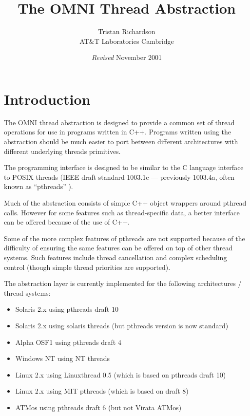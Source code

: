 \documentclass[11pt,twoside,a4paper]{article}
\title{The OMNI Thread Abstraction}
\author{Tristan Richardson\\
AT\&T Laboratories Cambridge \\
}
\date{\textit{Revised} November 2001}
\begin{document}
\maketitle

\section{Introduction}

The OMNI thread abstraction is designed to provide a common set of
thread operations for use in programs written in C++.  Programs
written using the abstraction should be much easier to port between
different architectures with different underlying threads primitives.

The programming interface is designed to be similar to the C language
interface to POSIX threads (IEEE draft standard 1003.1c --- previously
1003.4a, often known as ``pthreads'' \cite{pthreads}).

Much of the abstraction consists of simple C++ object wrappers around
pthread calls.  However for some features such as thread-specific
data, a better interface can be offered because of the use of C++.

Some of the more complex features of pthreads are not supported
because of the difficulty of ensuring the same features can be offered
on top of other thread systems.  Such features include thread
cancellation and complex scheduling control (though simple thread
priorities are supported).

The abstraction layer is currently implemented for the following
architectures / thread systems:

\begin{itemize}

\item Solaris 2.x using pthreads draft 10
\item Solaris 2.x using solaris threads (but pthreads version is now standard)
\item Alpha OSF1 using pthreads draft 4
\item Windows NT using NT threads
\item Linux 2.x using Linuxthread 0.5 (which is based on pthreads draft 10)
\item Linux 2.x using MIT pthreads (which is based on draft 8)
\item ATMos using pthreads draft 6 (but not Virata ATMos)

\end{itemize}
\end{document}

